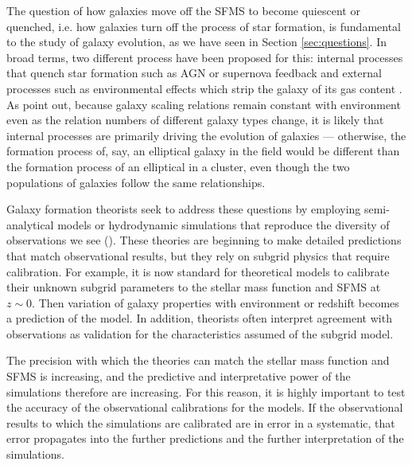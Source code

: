 
The question of how galaxies move off the SFMS to become quiescent or
quenched, i.e. how galaxies turn off the process of star formation, is
fundamental to the study of galaxy evolution, as we have seen in
Section \ref{sec:questions}. In broad terms, two different process
have been proposed for this: internal processes that quench star
formation such as AGN or supernova feedback \citep{peng_mass_2010} and
external processes such as environmental effects which strip the
galaxy of its gas content \citep{peng_mass_2012,
  2012ApJ...757...85G}. As \citet{blanton_physical_2019-1} point out,
because galaxy scaling relations remain constant with environment even
as the relation numbers of different galaxy types change, it is likely
that internal processes are primarily driving the evolution of
galaxies --- otherwise, the formation process of, say, an elliptical
galaxy in the field would be different than the formation process of
an elliptical in a cluster, even though the two populations of
galaxies follow the same relationships. 

Galaxy formation theorists seek to address these questions by
employing semi-analytical models or hydrodynamic simulations that
reproduce the diversity of observations we see
(\citealt{somerville15a}). These theories are beginning to make
detailed predictions that match observational results, but they rely
on subgrid physics that require calibration. For example, it is now
standard for theoretical models to calibrate their unknown subgrid
parameters to the stellar mass function and SFMS at $z\sim 0$.  Then
variation of galaxy properties with environment or redshift becomes a
prediction of the model. In addition, theorists often interpret
agreement with observations as validation for the characteristics
assumed of the subgrid model.

The precision with which the theories can match the stellar mass
function and SFMS is increasing, and the predictive and interpretative
power of the simulations therefore are increasing. For this reason, it
is highly important to test the accuracy of the observational
calibrations for the models. If the observational results to which the
simulations are calibrated are in error in a systematic, that error
propagates into the further predictions and the further interpretation
of the simulations.

